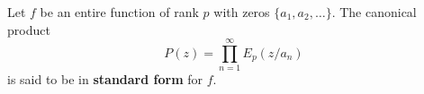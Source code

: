Let $f$ be an entire function of rank $p$ with zeros $\{a_1, a_2, \ldots\}$. The canonical product
$$P(z) = \prod_{n=1}^{\infty} E_p(z/a_n)$$
is said to be in \textbf{standard form} for $f$.
